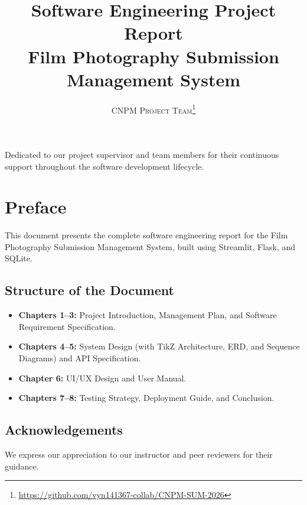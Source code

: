 \documentclass[a4paper,11pt,oneside]{book}
\title{\Huge \textbf{Software Engineering Project Report} \\ \huge Film Photography Submission Management System}
\author{\textsc{CNPM Project Team}\thanks{\url{https://github.com/vyn141367-collab/CNPM-SUM-2026}}}
\newenvironment{dedication}
{
   \cleardoublepage
   \thispagestyle{empty}
   \vspace*{\stretch{1}}
   \hfill\begin{minipage}[t]{0.66\textwidth}
   \raggedright
}
{
   \end{minipage}
   \vspace*{\stretch{3}}
   \clearpage
}
\begin{document}
\frontmatter
\maketitle

\begin{dedication}
Dedicated to our project supervisor and team members for their continuous support throughout the software development lifecycle.
\end{dedication}

\tableofcontents
\listoffigures
\listoftables

\mainmatter

\chapter*{Preface}
This document presents the complete software engineering report for the Film Photography Submission Management System, built using Streamlit, Flask, and SQLite.

\section*{Structure of the Document}
\begin{itemize}
  \item \textbf{Chapters 1--3:} Project Introduction, Management Plan, and Software Requirement Specification.
  \item \textbf{Chapters 4--5:} System Design (with TikZ Architecture, ERD, and Sequence Diagrams) and API Specification.
  \item \textbf{Chapter 6:} UI/UX Design and User Manual.
  \item \textbf{Chapters 7--8:} Testing Strategy, Deployment Guide, and Conclusion.
\end{itemize}

\section*{Acknowledgements}
We express our appreciation to our instructor and peer reviewers for their guidance.









\end{document}
